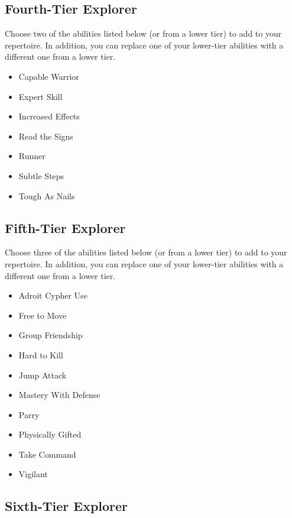 \subsection{Fourth-Tier Explorer}

Choose two of the abilities listed below (or from a lower tier) to add to your repertoire. In addition, you can replace one of your lower-tier abilities with a different one from a lower tier.

\begin{itemize}
\item Capable Warrior
\item Expert Skill
\item Increased Effects
\item Read the Signs
\item Runner
\item Subtle Steps
\item Tough As Nails
\end{itemize}

\subsection{Fifth-Tier Explorer}

Choose three of the abilities listed below (or from a lower tier) to add to your repertoire. In addition, you can replace one of your lower-tier abilities with a different one from a lower tier.

\begin{itemize}
\item Adroit Cypher Use
\item Free to Move
\item Group Friendship
\item Hard to Kill
\item Jump Attack
\item Mastery With Defense
\item Parry
\item Physically Gifted
\item Take Command
\item Vigilant
\end{itemize}

\subsection{Sixth-Tier Explorer}

